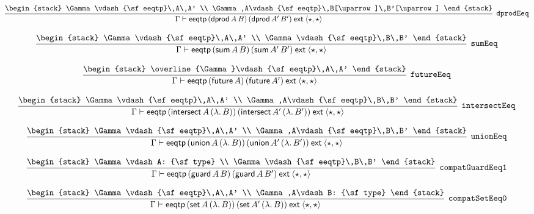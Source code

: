 \[
\infer[{\tt dprodEeq}]{\Gamma \vdash {\sf eeqtp}\,({\sf dprod}\,A\,B)\,({\sf dprod}\,A'\,B')\:{\sf ext}\:\langle \star ,\star \rangle }{
\begin{stack}
\Gamma \vdash {\sf eeqtp}\,A\,A'
\\
\Gamma ,A\vdash {\sf eeqtp}\,B[\uparrow ]\,B'[\uparrow ]
\end{stack}}
\]

\[
\infer[{\tt sumEeq}]{\Gamma \vdash {\sf eeqtp}\,({\sf sum}\,A\,B)\,({\sf sum}\,A'\,B')\:{\sf ext}\:\langle \star ,\star \rangle }{
\begin{stack}
\Gamma \vdash {\sf eeqtp}\,A\,A'
\\
\Gamma \vdash {\sf eeqtp}\,B\,B'
\end{stack}}
\]

\[
\infer[{\tt futureEeq}]{\Gamma \vdash {\sf eeqtp}\,({\sf future}\,A)\,({\sf future}\,A')\:{\sf ext}\:\langle \star ,\star \rangle }{
\begin{stack}
\overline{\Gamma}\vdash {\sf eeqtp}\,A\,A'
\end{stack}}
\]

\[
\infer[{\tt intersectEeq}]{\Gamma \vdash {\sf eeqtp}\,({\sf intersect}\,A\,(\lambda .\,B))\,({\sf intersect}\,A'\,(\lambda .\,B'))\:{\sf ext}\:\langle \star ,\star \rangle }{
\begin{stack}
\Gamma \vdash {\sf eeqtp}\,A\,A'
\\
\Gamma ,A\vdash {\sf eeqtp}\,B\,B'
\end{stack}}
\]

\[
\infer[{\tt unionEeq}]{\Gamma \vdash {\sf eeqtp}\,({\sf union}\,A\,(\lambda .\,B))\,({\sf union}\,A'\,(\lambda .\,B'))\:{\sf ext}\:\langle \star ,\star \rangle }{
\begin{stack}
\Gamma \vdash {\sf eeqtp}\,A\,A'
\\
\Gamma ,A\vdash {\sf eeqtp}\,B\,B'
\end{stack}}
\]

\[
\infer[{\tt compatGuardEeq1}]{\Gamma \vdash {\sf eeqtp}\,({\sf guard}\,A\,B)\,({\sf guard}\,A\,B')\:{\sf ext}\:\langle \star ,\star \rangle }{
\begin{stack}
\Gamma \vdash A: {\sf type}
\\
\Gamma \vdash {\sf eeqtp}\,B\,B'
\end{stack}}
\]

\[
\infer[{\tt compatSetEeq0}]{\Gamma \vdash {\sf eeqtp}\,({\sf set}\,A\,(\lambda .\,B))\,({\sf set}\,A'\,(\lambda .\,B))\:{\sf ext}\:\langle \star ,\star \rangle }{
\begin{stack}
\Gamma \vdash {\sf eeqtp}\,A\,A'
\\
\Gamma ,A\vdash B: {\sf type}
\end{stack}}
\]

